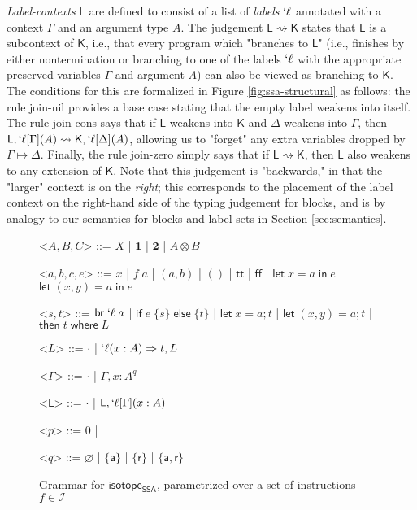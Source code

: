 \documentclass[acmsmall,screen,review]{acmart}
\newcommand{\mc}[1]{\ensuremath{\mathcal{#1}}}
\newcommand{\ms}[1]{\ensuremath{\mathsf{#1}}}
\newcommand{\lbl}[1]{{`#1}}
\newcommand{\lto}{\Rightarrow}
\newcommand{\ctt}{\ms{tt}}
\newcommand{\cff}{\ms{ff}}
\newcommand{\letexpr}[3]{\ensuremath{\ms{let}\;#1 = #2\;\ms{in}\;#3}}
\newcommand{\letstmt}[3]{\ensuremath{\ms{let}\;#1 = #2; #3}}
\newcommand{\brb}[2]{\ms{br}\;#1\;#2}
\newcommand{\lbrb}[2]{\brb{\lbl{#1}}{#2}}
\newcommand{\ite}[3]{\ms{if}\;#1\;\{#2\}\;\ms{else}\;\{#3\}}
\newcommand{\ewhere}[2]{\ms{then}\;#1\;\ms{where}\;#2}
\newcommand{\wbranch}[3]{#1(#2) \lto #3}
\newcommand{\lwbranch}[3]{\wbranch{\lbl{#1}}{#2}{#3}}
\newcommand{\cwk}[2]{#1 \mapsto #2}
\newcommand{\lwk}[2]{#1 \rightsquigarrow #2}
\newcommand{\thyp}[3]{#1: {#2}^{#3}}
\newcommand{\lhyp}[3]{#1[#2](#3)}
\newcommand{\llhyp}[3]{\lhyp{\lbl{#1}}{#2}{#3}}
\newcommand{\rle}[1]{{\scriptsize\textsf{#1}}}
\newcommand{\taff}{{\{\ms{a}\}}}
\newcommand{\trel}{{\{\ms{r}\}}}
\newcommand{\tint}{{\{\ms{a}, \ms{r}\}}}
\newcommand{\isotopessa}{\ms{isotope_{SSA}}}
\begin{document}
\textit{Label-contexts} \(\ms{L}\) are defined to consist of a list of
\textit{labels} \(\lbl{\ell}\) annotated with a context \(\Gamma\) and an
argument type \(A\). The judgement \(\lwk{\ms{L}}{\ms{K}}\) states that
\(\ms{L}\) is a subcontext of \(\ms{K}\), i.e., that every program which
"branches to \(\ms{L}\)" (i.e., finishes by either nontermination or branching
to one of the labels \(\lbl{\ell}\) with the appropriate preserved variables
\(\Gamma\) and argument \(A\)) can also be viewed as branching to \(\ms{K}\).
The conditions for this are formalized in Figure \ref{fig:ssa-structural} as
follows: the rule \rle{join-nil} provides a base case stating that the empty
label weakens into itself. The rule \rle{join-cons} says that if \(\ms{L}\)
weakens into \(\ms{K}\) and \(\Delta\) weakens into \(\Gamma\), then
\(\lwk{\ms{L}, \llhyp{\ell}{\Gamma}{A}}{\ms{K}, \llhyp{\ell}{\Delta}{A}}\),
allowing us to "forget" any extra variables dropped by \(\cwk{\Gamma}{\Delta}\).
Finally, the rule \rle{join-zero} simply says that if \(\lwk{\ms{L}}{\ms{K}}\),
then \(\ms{L}\) also weakens to any extension of \(\ms{K}\). Note that this
judgement is "backwards," in that the "larger" context is on the \textit{right};
this corresponds to the placement of the label context on the right-hand side of
the typing judgement for blocks, and is by analogy to our semantics for blocks
and label-sets in Section \ref{sec:semantics}.

\begin{figure}
  \begin{center}
    \begin{grammar}
      <\(A, B, C\)> ::= 
      \(X\)
      \;|\; \(\mathbf{1}\)
      \;|\; \(\mathbf{2}\)
      \;|\; \(A \otimes B\)

      <\(a, b, c, e\)> ::= \(x\) 
      \;|\; \(f\;a\)
      \;|\; \((a, b)\) 
      \;|\; \(()\) 
      \;|\; \(\ctt\) 
      \;|\; \(\cff\)
      \;|\; \(\letexpr{x}{a}{e}\)
      \;|\; \(\letexpr{(x, y)}{a}{e}\)
      
      <\(s, t\)> ::= \(\lbrb{\ell}{a}\) 
      \;|\; \(\ite{e}{s}{t}\)
      \;|\; \(\letstmt{x}{a}{t}\)
      \;|\; \(\letstmt{(x, y)}{a}{t}\)
      \;|\; \(\ewhere{t}{L}\)

      <\(L\)> ::= \(\cdot\) \;|\; \(\lwbranch{\ell}{x: A}{t}, L\)

      <\(\Gamma\)> ::= \(\cdot\) \;|\; \(\Gamma, \thyp{x}{A}{q}\)

      <\(\ms{L}\)> ::= \(\cdot\) \;|\; \(\ms{L}, \lbl{\ell}[\Gamma](x: A)\)

      <\(p\)> ::= 0 \;|

      <\(q\)> ::= \(\varnothing\) 
      \;|\; \(\taff\) 
      \;|\; \(\trel\) 
      \;|\; \(\tint\)
    \end{grammar}
  \end{center}
  \caption{Grammar for \isotopessa, parametrized over a set of instructions \(f \in \mc{I}\)}
  \label{fig:ssa-grammar}
\end{figure}
\end{document}
